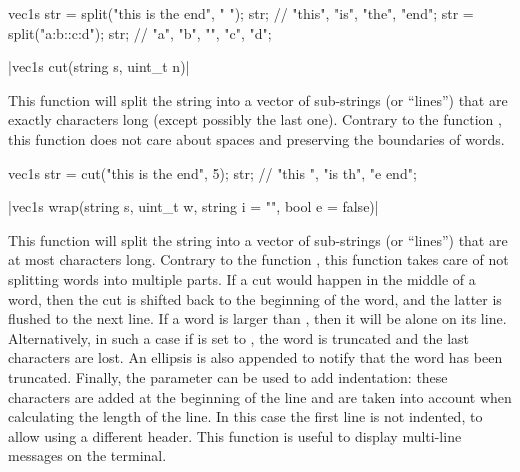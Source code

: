 \begin{example}
\begin{cppcode}
vec1s str = split("this is the end", " ");
str; // {"this", "is", "the", "end"};
str = split("a:b::c:d");
str; // {"a", "b", "", "c", "d"};
\end{cppcode}
\end{example}

\funcitem \cppinline|vec1s cut(string s, uint_t n)| 

This function will split the string  into a vector of sub-strings (or ``lines'') that are exactly  characters long (except possibly the last one). Contrary to the function , this function does not care about spaces and preserving the boundaries of words.

\begin{example}
\begin{cppcode}
vec1s str = cut("this is the end", 5);
str; // {"this ", "is th", "e end"};
\end{cppcode}
\end{example}

\funcitem \cppinline|vec1s wrap(string s, uint_t w, string i = "", bool e = false)| 

This function will split the string  into a vector of sub-strings (or ``lines'') that are at most  characters long. Contrary to the function , this function takes care of not splitting words into multiple parts. If a cut would happen in the middle of a word, then the cut is shifted back to the beginning of the word, and the latter is flushed to the next line. If a word is larger than , then it will be alone on its line. Alternatively, in such a case if  is set to , the word is truncated and the last characters are lost. An ellipsis  is also appended to notify that the word has been truncated. Finally, the parameter  can be used to add indentation: these characters are added at the beginning of the line and are taken into account when calculating the length of the line. In this case the first line is not indented, to allow using a different header. This function is useful to display multi-line messages on the terminal.

